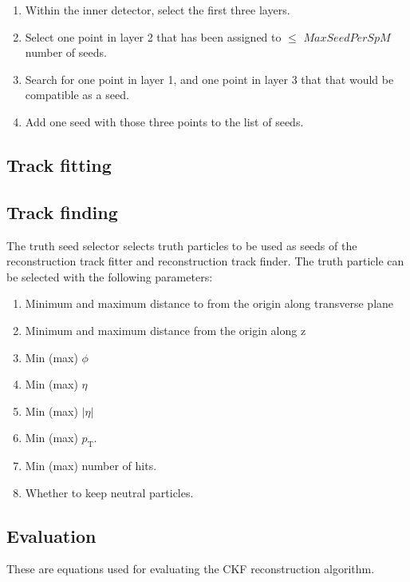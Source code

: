 \documentclass{article}
\newcommand{\pt}[0]{p_\textrm{T}}
\begin{document}
\begin{enumerate}
\item Within the inner detector, select the first three layers.
\item Select one point in layer 2 that has been assigned to $\leq$ $MaxSeedPerSpM$ number of seeds.
\item Search for one point in layer 1, and one point in layer 3 that that would be compatible as a seed.
\item Add one seed with those three points to the list of seeds.
\end{enumerate}

\subsection{Track fitting}

\subsection{Track finding}

The truth seed selector selects truth particles to be used as seeds of the reconstruction track fitter and reconstruction track finder. The truth particle can be selected with the following parameters:

\begin{enumerate}
\item Minimum and maximum distance to from the origin along transverse plane
\item Minimum and maximum distance from the origin along z
\item Min (max) $\phi$
\item Min (max) $\eta$
\item Min (max) $|\eta|$
\item Min (max) $\pt$.
\item Min (max) number of hits. 
\item Whether to keep neutral particles.
\end{enumerate}

\subsection{Evaluation}

These are equations used for evaluating the CKF reconstruction algorithm.

\end{document}
